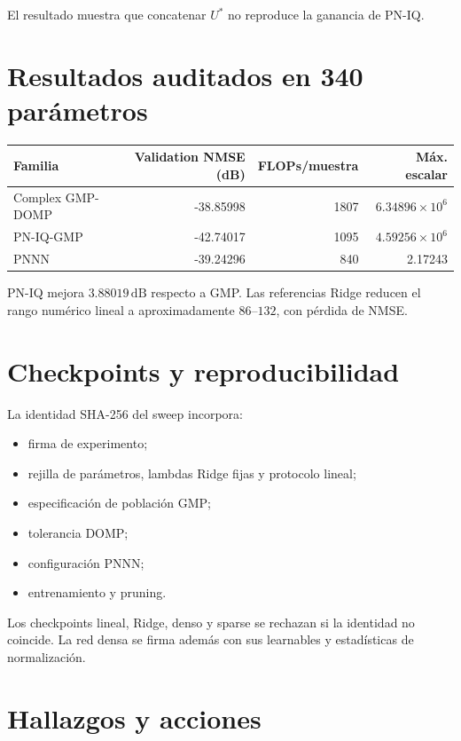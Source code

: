 \documentclass[10pt,a4paper]{article}
\begin{document}
El resultado muestra que concatenar \(U^*\) no reproduce la ganancia de
PN-IQ.

\section{Resultados auditados en 340 parámetros}

\begin{center}
\begin{tabular}{lrrr}
\toprule
Familia & Validation NMSE (dB) & FLOPs/muestra & Máx. escalar\\
\midrule
Complex GMP-DOMP & -38.85998 & 1807 & \(6.34896\times10^6\)\\
PN-IQ-GMP & -42.74017 & 1095 & \(4.59256\times10^6\)\\
PNNN & -39.24296 & 840 & 2.17243\\
\bottomrule
\end{tabular}
\end{center}

PN-IQ mejora \(3.88019\,\mathrm{dB}\) respecto a GMP. Las referencias Ridge
reducen el rango numérico lineal a aproximadamente \(86\)--\(132\), con
pérdida de NMSE.

\section{Checkpoints y reproducibilidad}

La identidad SHA-256 del sweep incorpora:

\begin{itemize}[leftmargin=*]
\item firma de experimento;
\item rejilla de parámetros, lambdas Ridge fijas y protocolo lineal;
\item especificación de población GMP;
\item tolerancia DOMP;
\item configuración PNNN;
\item entrenamiento y pruning.
\end{itemize}

Los checkpoints lineal, Ridge, denso y sparse se rechazan si la identidad no
coincide. La red densa se firma además con sus learnables y estadísticas de
normalización.

\section{Hallazgos y acciones}
\end{document}
